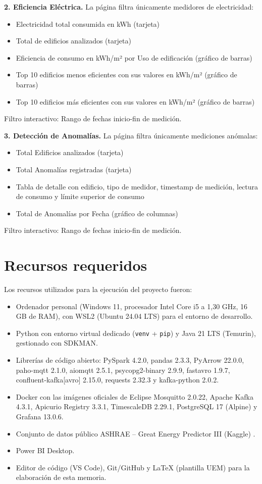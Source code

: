 \textbf{2. Eficiencia Eléctrica.}
La página filtra únicamente medidores de electricidad:
\begin{itemize}
  \item Electricidad total consumida en kWh (tarjeta)
  \item Total de edificios analizados (tarjeta)
  \item Eficiencia de consumo en kWh/m² por Uso de edificación (gráfico de barras)
  \item Top 10 edificios menos eficientes con sus valores en kWh/m² (gráfico de barras)
  \item Top 10 edificios más eficientes con sus valores en kWh/m² (gráfico de barras)
\end{itemize}
Filtro interactivo: Rango de fechas inicio-fin de medición.

\textbf{3. Detección de Anomalías.}
La página filtra únicamente mediciones anómalas:
\begin{itemize}
  \item Total Edificios analizados (tarjeta)
  \item Total Anomalías registradas (tarjeta)
  \item Tabla de detalle con edificio, tipo de medidor, timestamp de medición, lectura de consumo y límite superior de consumo
  \item Total de Anomalías por Fecha (gráfico de columnas)
\end{itemize}
Filtro interactivo: Rango de fechas inicio-fin de medición.

\section{Recursos requeridos}

Los recursos utilizados para la ejecución del proyecto fueron:

\begin{itemize}
  \item Ordenador personal (Windows 11, procesador Intel Core i5 a 1,30 GHz, 16 GB de RAM), con WSL2 (Ubuntu 24.04 LTS) para el entorno de desarrollo.
  \item Python con entorno virtual dedicado (\texttt{venv} + \texttt{pip}) y Java 21 LTS (Temurin), gestionado con SDKMAN.
  \item Librerías de código abierto: PySpark 4.2.0, pandas 2.3.3, PyArrow 22.0.0, paho-mqtt 2.1.0, aiomqtt 2.5.1, psycopg2-binary 2.9.9, fastavro 1.9.7, confluent-kafka[avro] 2.15.0, requests 2.32.3 y kafka-python 2.0.2.
  \item Docker con las imágenes oficiales de Eclipse Mosquitto 2.0.22, Apache Kafka 4.3.1, Apicurio Registry 3.3.1, TimescaleDB 2.29.1, PostgreSQL 17 (Alpine) y Grafana 13.0.6.
  \item Conjunto de datos público ASHRAE -- Great Energy Predictor III (Kaggle) \cite{ashrae2019}.
  \item Power BI Desktop.
  \item Editor de código (VS Code), Git/GitHub y LaTeX (plantilla UEM) para la elaboración de esta memoria.
\end{itemize}


